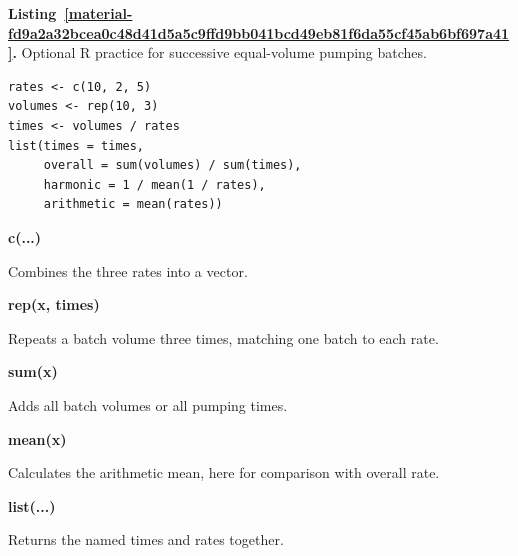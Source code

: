 \documentclass[11pt,a4paper]{article}
\newcounter{listing}
\begin{document}
\par\medskip
{}
\label{material-fd9a2a32bcea0c48d41d5a5c9ffd9bb041bcd49eb81f6da55cf45ab6bf697a41}
\noindent\textbf{Listing~\ref*{material-fd9a2a32bcea0c48d41d5a5c9ffd9bb041bcd49eb81f6da55cf45ab6bf697a41}.} Optional R practice for successive equal-volume pumping batches.\par\nopagebreak
\begin{Verbatim}[fontsize=\footnotesize,breaklines=true,breakanywhere=true]
rates <- c(10, 2, 5)
volumes <- rep(10, 3)
times <- volumes / rates
list(times = times,
     overall = sum(volumes) / sum(times),
     harmonic = 1 / mean(1 / rates),
     arithmetic = mean(rates))
\end{Verbatim}

\par\noindent\textbf{c(...)}

Combines the three rates into a vector.

\par\noindent\textbf{rep(x, times)}

Repeats a batch volume three times, matching one batch to each rate.

\par\noindent\textbf{sum(x)}

Adds all batch volumes or all pumping times.

\par\noindent\textbf{mean(x)}

Calculates the arithmetic mean, here for comparison with overall rate.

\par\noindent\textbf{list(...)}

Returns the named times and rates together.

\medskip
\end{document}
